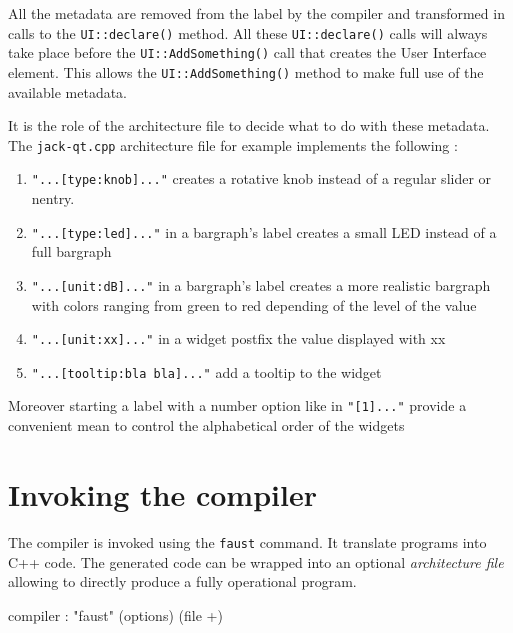 \documentclass[a4paper]{book}
\begin{document}
All the metadata are removed from the label by the compiler and 
transformed in calls to the \lstinline'UI::declare()' method. All these 
\lstinline'UI::declare()' calls will always take place before the \lstinline'UI::AddSomething()' 
call that creates the User Interface element. This allows the 
\lstinline'UI::AddSomething()'  method to make full use of the available metadata.

It is the role of the architecture file to decide what to do with these 
metadata. The \lstinline'jack-qt.cpp' architecture file for example implements the 
following :
\begin{enumerate}
\item \lstinline'"...[type:knob]..."' creates a rotative knob instead of a regular 
slider or nentry.
\item \lstinline'"...[type:led]..."' in a bargraph's label creates a small LED instead 
of a full bargraph
\item \lstinline'"...[unit:dB]..."' in a bargraph's label creates a more realistic 
bargraph with colors ranging from green to red depending of the level of 
the value
\item \lstinline'"...[unit:xx]..."' in a widget postfix the value displayed with xx
\item \lstinline'"...[tooltip:bla bla]..."' add a tooltip to the widget
\end{enumerate}

Moreover starting a label with a number option like in \lstinline'"[1]..."' provide 
a convenient mean to control the alphabetical order of the widgets








\chapter{Invoking the \faust compiler}
The \faust compiler is invoked using the \texttt{faust} command. It translate \faust programs into C++ code.
The generated code can be wrapped into an optional \emph{architecture file} allowing to directly produce a fully operational program.

\begin{syntdiag}
compiler : "faust" (options) (file +)
\end{syntdiag}
\end{document}
